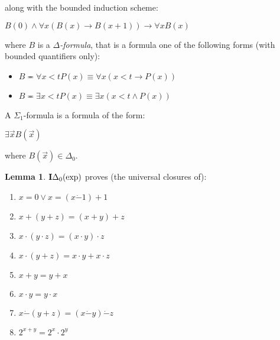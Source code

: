 \documentclass[8pt]{article}
\theoremstyle{definition}
\theoremstyle{definition}
\theoremstyle{definition}
\theoremstyle{definition}
\theoremstyle{definition}
\theoremstyle{definition}
\theoremstyle{definition}
\theoremstyle{definition}
\newtheorem{lemma}{Lemma}[section]
\theoremstyle{definition}
\theoremstyle{definition}
\theoremstyle{definition}
\theoremstyle{definition}
\theoremstyle{definition}
\theoremstyle{question}
\begin{document}
along with the bounded induction scheme:
\begin{center}
  $B(0) \land \forall x (B (x) \to B(x + 1)) \to \forall x B(x)$
\end{center}
where $B$ is a \emph{$\Delta$-formula}, that is a formula one of the following forms (with bounded quantifiers only):
\begin{itemize}
  \item $B \eqcirc \forall x < t P(x) \equiv \forall x (x < t \to P(x))$ 
  \item $B \eqcirc \exists x < t P(x) \equiv \exists x (x < t \land P(x))$
\end{itemize}

A $\Sigma_1$-formula is a formula of the form:
\begin{center}
  $\exists \vec{x} B(\vec{x})$
\end{center}
where $B(\vec{x}) \in \Delta_0$.

\begin{lemma}
  ${\bf I}\Delta_0(\operatorname{exp})$ proves (the universal closures of):
  \begin{enumerate}
    \item $x = 0 \lor x = (x \dot{-} 1) + 1$
    \item $x + (y + z) = (x + y) + z$
    \item $x \cdot (y \cdot z) = (x \cdot y) \cdot z$
    \item $x \cdot (y + z) = x \cdot y + x \cdot z$
    \item $x + y = y + x$
    \item $x \cdot y = y \cdot x$
    \item $x \dot{-} (y + z) = (x \dot{-} y) \dot{-} z$
    \item $2^{x + y} = 2^x \cdot 2^y$
  \end{enumerate}
\end{lemma}
\end{document}
